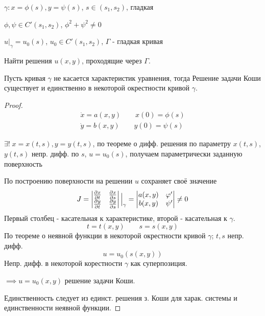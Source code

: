 \documentclass{article}
\begin{document}

\begin{definition}
\phantom{.}

$\gamma: x=\phi(s), y=\psi(s)$, $s\in(s_1,s_2)$, гладкая

$\phi,\psi \in C'(s_1,s_2)$, $\phi^{2}+\psi^{2}\neq 0$

$u|_{\gamma}=u_0(s)$, $u_0\in C'(s_1,s_2)$, $\Gamma$ - гладкая кривая

  Найти решения $u(x,y)$, проходящие через $\Gamma$.
\end{definition}

\begin{theorem}
  \phantom{.}

  Пусть кривая $\gamma$ не касается характеристик уравнения,
  тогда Решение задачи Коши существует и единственно в некоторой
  окрестности кривой $\gamma$.
\end{theorem}
\begin{proof}
  \begin{gather*}
    \dot{x}=a(x,y) \qquad x(0)=\phi(s) \\ 
    \dot{y}=b(x,y) \qquad y(0)=\psi(s)
  \end{gather*}


  $\exists ! \; x=x(t,s), y=y(t,s)$, по теореме о дифф. решения по параметру
  $x(t,s)$, $y(t,s)$ непр. дифф. по $s$, $u=u_0(s)$, получаем параметрически
  заданную поверхность

  По построению поверхности на решении $u$ сохраняет своё значение
  \[
    J=\begin{vmatrix}
      \frac{\partial{x}}{\partial{t}} & \frac{\partial{x}}{\partial{s}} \\ 
      \frac{\partial{y}}{\partial{t}} & \frac{\partial{y}}{\partial{s}}
    \end{vmatrix}\Big|_{\gamma} = \begin{vmatrix}
      a(x,y) & \varphi' \\ 
      b(x,y) & \psi'
    \end{vmatrix} \neq 0
  \] 
  Первый столбец - касательная к характеристике, второй - касательная к $\gamma$.
  \[
    t=t(x,y) \qquad s=s(x,y)
  \]
  По теореме о неявной функции в некоторой окрестности кривой $\gamma$;
  $t,s$ непр. дифф.
  \[
    u=u_0(s(x,y))
  \]
  Непр. дифф. в некоторой корестности $\gamma$ как суперпозиция.

  $\implies u=u_0(x,y)$ решение  задачи Коши.
  
  Единственность следует из единст. решения з. Коши для харак. системы и
  единственности неявной функции.
\end{proof}
\end{document}

